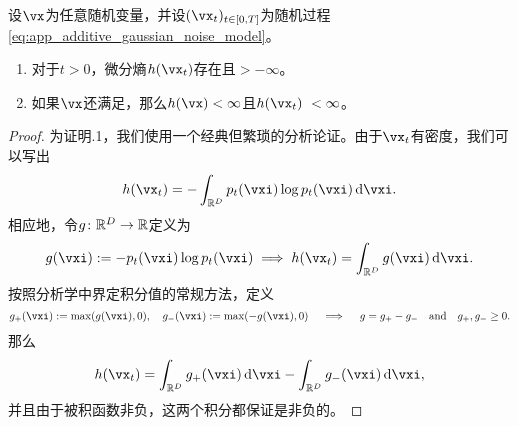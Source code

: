 \documentclass[../../book-main.tex]{subfiles}
\begin{document}
\begin{lemma}\label{lem:diffusion_entropy_exists}
    设\(\vx\)为任意随机变量，并设\((\vx_{t})_{t \in [0, T]}\)为随机过程\eqref{eq:app_additive_gaussian_noise_model}。
    \begin{enumerate}
        \item 对于\(t > 0\)，微分熵\(h(\vx_{t})\)存在且\(> -\infty\)。
        \item 如果\(\vx\)还满足，那么\(h(\vx) < \infty\)且\(h(\vx_{t})\ < \infty\)。
    \end{enumerate}
\end{lemma}
\begin{proof}
    为证明.1，我们使用一个经典但繁琐的分析论证。由于\(\vx_{t}\)有密度，我们可以写出
    \begin{equation}
        h(\vx_{t}) = -\int_{\R^{D}}p_{t}(\vxi)\log p_{t}(\vxi) \odif{\vxi}.
    \end{equation}
    相应地，令\(g \colon \mathbb{R}^{D} \to \mathbb{R}\)定义为
    \begin{equation}
        g(\vxi) := -p_{t}(\vxi)\log p_{t}(\vxi) \implies h(\vx_{t}) = \int_{\R^{D}}g(\vxi)\odif{\vxi}.
    \end{equation}
    按照分析学中界定积分值的常规方法，定义
    \begin{equation}
        g_{+}(\vxi) := \max(g(\vxi), 0), \quad g_{-}(\vxi) := \max(-g(\vxi), 0) \quad \implies \quad g = g_{+} - g_{-}\quad \text{and} \quad g_{+}, g_{-} \geq 0.
    \end{equation}
    那么
    \begin{equation}
        h(\vx_{t}) = \int_{\R^{D}}g_{+}(\vxi)\odif{\vxi} - \int_{\R^{D}}g_{-}(\vxi)\odif{\vxi},
    \end{equation}
    并且由于被积函数非负，这两个积分都保证是非负的。
    

\end{proof}
\end{document}
